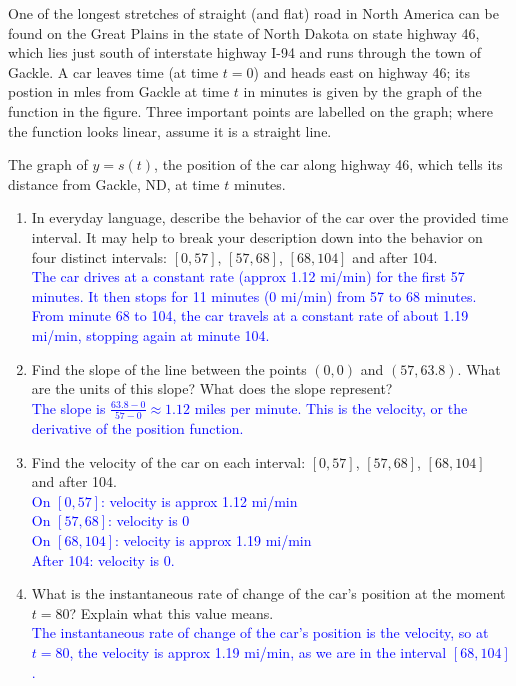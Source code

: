 \documentclass{ximera}
\begin{document}
\begin{exercise}
    One of the longest stretches of straight (and flat) road in North America can be found on the Great Plains in the state of North Dakota on state highway 46, which lies just south of interstate highway I-94 and runs through the town of Gackle.  A car leaves time (at time $t=0$) and heads east on highway 46; its postion in mles from Gackle at time $t$ in minutes is given by the graph of the function in the figure.  Three important points are labelled on the graph; where the function looks linear, assume it is a straight line.
    \begin{center}
    \end{center}
    The graph of $y=s(t)$, the position of the car along highway 46, which tells its distance from Gackle, ND, at time $t$ minutes.
    \begin{enumerate}
        \item In everyday language, describe the behavior of the car over the provided time interval. It may help to break your description down into the behavior on four distinct intervals: $[0,57]$, $[57,68]$, $[68,104]$ and after 104.\\
        \textcolor{blue}{The car drives at a constant rate (approx 1.12 mi/min) for the first 57 minutes.  It then stops for 11 minutes (0 mi/min) from 57 to 68 minutes.  From minute 68 to 104, the car travels at a constant rate of about 1.19 mi/min, stopping again at minute 104.}
        \item Find the slope of the line between the points $(0,0)$ and $(57, 63.8)$.  What are the units of this slope?  What does the slope represent?\\
        \textcolor{blue}{The slope is $\frac{63.8-0}{57-0}\approx 1.12$ miles per minute.  This is the velocity, or the derivative of the position function.}
        \item Find the velocity of the car on each interval: $[0,57]$, $[57,68]$, $[68,104]$ and after 104.\\
        \textcolor{blue}{On $[0,57]$: velocity is approx 1.12 mi/min\\
        On $[57,68]$: velocity is 0\\
        On $[68, 104]$: velocity is approx 1.19 mi/min\\
        After 104: velocity is 0.}
        \item What is the instantaneous rate of change of the car's position at the moment $t=80$?  Explain what this value means.\\
        \textcolor{blue}{The instantaneous rate of change of the car's position is the velocity, so at $t=80$, the velocity is approx 1.19 mi/min, as we are in the interval $[68, 104]$.}
    \end{enumerate}
\end{exercise}
\end{document}
